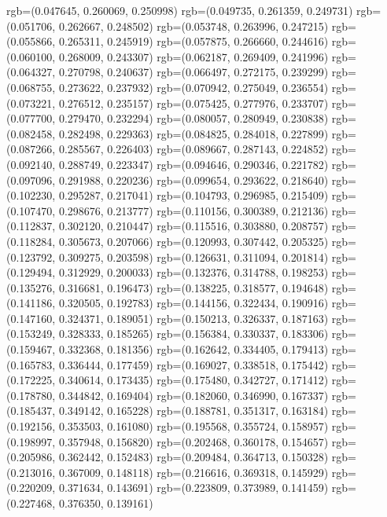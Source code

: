 {{{					rgb=(0.047645, 0.260069, 0.250998)
					rgb=(0.049735, 0.261359, 0.249731)
					rgb=(0.051706, 0.262667, 0.248502)
					rgb=(0.053748, 0.263996, 0.247215)
					rgb=(0.055866, 0.265311, 0.245919)
					rgb=(0.057875, 0.266660, 0.244616)
					rgb=(0.060100, 0.268009, 0.243307)
					rgb=(0.062187, 0.269409, 0.241996)
					rgb=(0.064327, 0.270798, 0.240637)
					rgb=(0.066497, 0.272175, 0.239299)
					rgb=(0.068755, 0.273622, 0.237932)
					rgb=(0.070942, 0.275049, 0.236554)
					rgb=(0.073221, 0.276512, 0.235157)
					rgb=(0.075425, 0.277976, 0.233707)
					rgb=(0.077700, 0.279470, 0.232294)
					rgb=(0.080057, 0.280949, 0.230838)
					rgb=(0.082458, 0.282498, 0.229363)
					rgb=(0.084825, 0.284018, 0.227899)
					rgb=(0.087266, 0.285567, 0.226403)
					rgb=(0.089667, 0.287143, 0.224852)
					rgb=(0.092140, 0.288749, 0.223347)
					rgb=(0.094646, 0.290346, 0.221782)
					rgb=(0.097096, 0.291988, 0.220236)
					rgb=(0.099654, 0.293622, 0.218640)
					rgb=(0.102230, 0.295287, 0.217041)
					rgb=(0.104793, 0.296985, 0.215409)
					rgb=(0.107470, 0.298676, 0.213777)
					rgb=(0.110156, 0.300389, 0.212136)
					rgb=(0.112837, 0.302120, 0.210447)
					rgb=(0.115516, 0.303880, 0.208757)
					rgb=(0.118284, 0.305673, 0.207066)
					rgb=(0.120993, 0.307442, 0.205325)
					rgb=(0.123792, 0.309275, 0.203598)
					rgb=(0.126631, 0.311094, 0.201814)
					rgb=(0.129494, 0.312929, 0.200033)
					rgb=(0.132376, 0.314788, 0.198253)
					rgb=(0.135276, 0.316681, 0.196473)
					rgb=(0.138225, 0.318577, 0.194648)
					rgb=(0.141186, 0.320505, 0.192783)
					rgb=(0.144156, 0.322434, 0.190916)
					rgb=(0.147160, 0.324371, 0.189051)
					rgb=(0.150213, 0.326337, 0.187163)
					rgb=(0.153249, 0.328333, 0.185265)
					rgb=(0.156384, 0.330337, 0.183306)
					rgb=(0.159467, 0.332368, 0.181356)
					rgb=(0.162642, 0.334405, 0.179413)
					rgb=(0.165783, 0.336444, 0.177459)
					rgb=(0.169027, 0.338518, 0.175442)
					rgb=(0.172225, 0.340614, 0.173435)
					rgb=(0.175480, 0.342727, 0.171412)
					rgb=(0.178780, 0.344842, 0.169404)
					rgb=(0.182060, 0.346990, 0.167337)
					rgb=(0.185437, 0.349142, 0.165228)
					rgb=(0.188781, 0.351317, 0.163184)
					rgb=(0.192156, 0.353503, 0.161080)
					rgb=(0.195568, 0.355724, 0.158957)
					rgb=(0.198997, 0.357948, 0.156820)
					rgb=(0.202468, 0.360178, 0.154657)
					rgb=(0.205986, 0.362442, 0.152483)
					rgb=(0.209484, 0.364713, 0.150328)
					rgb=(0.213016, 0.367009, 0.148118)
					rgb=(0.216616, 0.369318, 0.145929)
					rgb=(0.220209, 0.371634, 0.143691)
					rgb=(0.223809, 0.373989, 0.141459)
					rgb=(0.227468, 0.376350, 0.139161)
}}}

